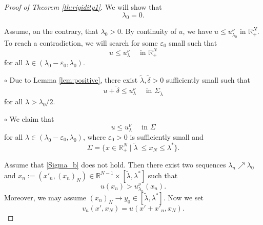 \documentclass[reqno]{amsart}
\theoremstyle{plain}
\theoremstyle{definition}
\theoremstyle{remark}
\begin{document}
\begin{proof}[Proof of Theorem \ref{th:rigidity1}]
		We will show that
		\[
		\lambda_0 = 0.
		\]
		
		Assume, on the contrary, that $\lambda_0>0$. By continuity of $u$, we have $u \le u_{\lambda_0}^\nu$ in $\mathbb{R}^N_+$. To reach a contradiction, we will search for some $\varepsilon_0$ small such that
		\begin{equation}\label{key}
			u \le u_\lambda^\nu \quad\text{ in } \mathbb{R}^N_+
		\end{equation}
		for all $\lambda \in (\lambda_0-\varepsilon_0, \lambda_0)$.
		
		$\circ$ Due to Lemma \ref{lem:positive}, there exist $\tilde{\lambda},\tilde{\delta}>0$ sufficiently small such that
		\begin{equation}\label{reflection_comparison_in2x}
			u+\tilde{\delta}\leq u_\lambda^\nu \quad\text{ in } \Sigma_{\tilde{\lambda}}
		\end{equation}
		for all $\lambda>\lambda_0/2$.
		
		$\circ$ We claim that
		\begin{equation}\label{Sigma_b}
			u \le u_\lambda^\nu \quad\text{ in } \Sigma
		\end{equation}
		for all $\lambda \in (\lambda_0-\varepsilon_0, \lambda_0)$, where $\varepsilon_0>0$ is sufficiently small and
		\[
		\Sigma = \{x\in\mathbb{R}^N_+ \mid \tilde{\lambda}\ \le x_N\le \lambda^*\}.
		\]
		
		Assume that \eqref{Sigma_b} does not hold. Then there exist two sequences $\lambda_n \nearrow \lambda_0$ and $x_n := (x'_n, (x_n)_N) \in \mathbb{R}^{N-1} \times [\tilde{\lambda}, \lambda^*]$ such that
		\begin{equation}\label{contra_sequence}
			u(x_n) > u_{\lambda_n}^\nu(x_n).
		\end{equation}
		Moreover, we may assume $(x_n)_N \to y_0 \in [\tilde{\lambda}, \lambda^*]$. Now we set
		\[
		v_n(x', x_N) = u(x'+x'_n, x_N).
		\]
		

\end{proof}
\end{document}
